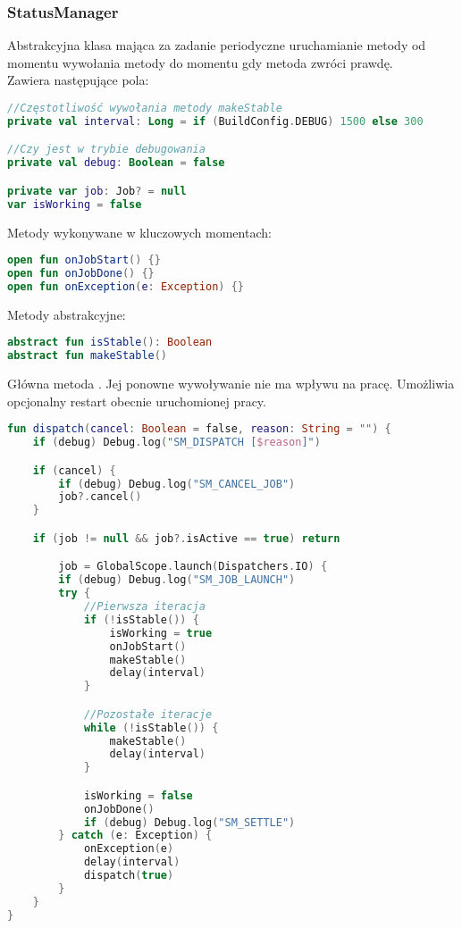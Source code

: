 \newpage

\subsubsection{StatusManager}
Abstrakcyjna klasa mająca za zadanie periodyczne uruchamianie metody  od momentu wywołania metody  do momentu gdy metoda  zwróci prawdę.\\

Zawiera następujące pola:
\begin{lstlisting}[language=Kotlin]
//Częstotliwość wywołania metody makeStable
private val interval: Long = if (BuildConfig.DEBUG) 1500 else 300

//Czy jest w trybie debugowania
private val debug: Boolean = false

private var job: Job? = null
var isWorking = false
\end{lstlisting}

\vspace{1em}

Metody wykonywane w kluczowych momentach:

\begin{lstlisting}[language=Kotlin]
open fun onJobStart() {}
open fun onJobDone() {}
open fun onException(e: Exception) {}
\end{lstlisting}

\vspace{1em}

Metody abstrakcyjne:

\begin{lstlisting}[language=Kotlin]
abstract fun isStable(): Boolean
abstract fun makeStable()
\end{lstlisting}

\newpage

Główna metoda . Jej ponowne wywoływanie nie ma wpływu na pracę. Umożliwia opcjonalny restart obecnie uruchomionej pracy.
\begin{lstlisting}[language=Kotlin]
fun dispatch(cancel: Boolean = false, reason: String = "") {
    if (debug) Debug.log("SM_DISPATCH [$reason]")

    if (cancel) {
        if (debug) Debug.log("SM_CANCEL_JOB")
        job?.cancel()
    }

    if (job != null && job?.isActive == true) return

        job = GlobalScope.launch(Dispatchers.IO) {
        if (debug) Debug.log("SM_JOB_LAUNCH")
        try {
            //Pierwsza iteracja
            if (!isStable()) {
                isWorking = true
                onJobStart()
                makeStable()
                delay(interval)
            }

            //Pozostałe iteracje
            while (!isStable()) {
                makeStable()
                delay(interval)
            }

            isWorking = false
            onJobDone()
            if (debug) Debug.log("SM_SETTLE")
        } catch (e: Exception) {
            onException(e)
            delay(interval)
            dispatch(true)
        }
    }
}
\end{lstlisting}

